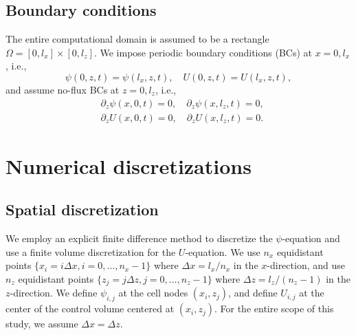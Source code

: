 \documentclass[final,times]{elsarticle}
\numberwithin{equation}{section}
\begin{document}
\subsection{Boundary conditions}
The entire computational domain is assumed to be a rectangle $\Omega = [0,l_x] \times [0,l_z]$. We impose periodic boundary conditions (BCs) at $x = 0, l_x$, i.e.,
\begin{equation}
\psi(0, z, t) = \psi(l_x, z, t), \quad U(0, z, t) = U(l_x, z, t),
\end{equation}
and assume no-flux BCs at $z=0, l_z$, i.e.,
\begin{align}
& \partial_z \psi (x,0,t) = 0 , \quad \partial_z \psi(x, l_z, t) = 0, \\
& \partial_z U (x,0,t) = 0 , \quad \partial_z U(x, l_z, t) = 0.
\end{align}


\section{Numerical discretizations}

\subsection{Spatial discretization}

We employ an explicit finite difference method to discretize the $\psi$-equation and use a finite volume discretization for the $U$-equation. We use $n_x$ equidistant points $\{ x_i = i \Delta x, i = 0,\dots, n_x-1\}$ where $\Delta x = l_x / n_x$ in the $x$-direction, and use $n_z$ equidistant points $\{ z_j = j \Delta z, j = 0,\dots, n_z-1\}$ where $\Delta z = l_z / (n_z-1)$ in the $z$-direction. We define $\psi_{i,j}$ at the cell nodes $(x_i,z_j)$, and define $U_{i,j}$ at the center of  the control volume centered at $(x_i, z_j)$. For the entire scope of this study, we assume $\Delta x = \Delta z$.
\end{document}
